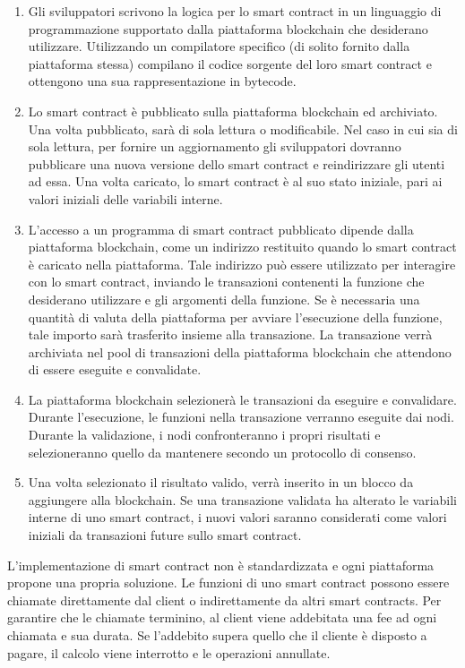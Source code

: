 \begin{enumerate}
    \item Gli sviluppatori scrivono la logica per lo smart contract in un linguaggio di programmazione supportato dalla piattaforma blockchain che desiderano utilizzare. Utilizzando un compilatore specifico (di solito fornito dalla piattaforma stessa) compilano il codice sorgente del loro smart contract e ottengono una sua rappresentazione in bytecode.
    \item Lo smart contract è pubblicato sulla piattaforma blockchain ed archiviato. Una volta pubblicato, sarà di sola lettura o modificabile. Nel caso in cui sia di sola lettura, per fornire un aggiornamento gli sviluppatori dovranno pubblicare una nuova versione dello smart contract e reindirizzare gli utenti ad essa. Una volta caricato, lo smart contract è al suo stato iniziale, pari ai valori iniziali delle variabili interne.
    \item L'accesso a un programma di smart contract pubblicato dipende dalla piattaforma blockchain, come un indirizzo restituito quando lo smart contract è caricato nella piattaforma. Tale indirizzo può essere utilizzato per interagire con lo smart contract, inviando le transazioni contenenti la funzione che desiderano utilizzare e gli argomenti della funzione. Se è necessaria una quantità di valuta della piattaforma per avviare l'esecuzione della funzione, tale importo sarà trasferito insieme alla transazione. La transazione verrà archiviata nel pool di transazioni della piattaforma blockchain che attendono di essere eseguite e convalidate.
    \item La piattaforma blockchain selezionerà le transazioni da eseguire e convalidare. Durante l'esecuzione, le funzioni nella transazione verranno eseguite dai nodi. Durante la validazione, i nodi confronteranno i propri risultati e selezioneranno quello da mantenere secondo un protocollo di consenso.
    \item Una volta selezionato il risultato valido, verrà inserito in un blocco da aggiungere alla blockchain. Se una transazione validata ha alterato le variabili interne di uno smart contract, i nuovi valori saranno considerati come valori iniziali da transazioni future sullo smart contract.
\end{enumerate}
L'implementazione di smart contract non è standardizzata e ogni piattaforma propone una propria soluzione. Le funzioni di uno smart contract possono essere chiamate direttamente dal client o indirettamente da altri smart contracts. Per garantire che le chiamate terminino, al client viene addebitata una fee ad ogni chiamata e sua durata. Se l'addebito supera quello che il cliente è disposto a pagare, il calcolo viene interrotto e le operazioni annullate.



